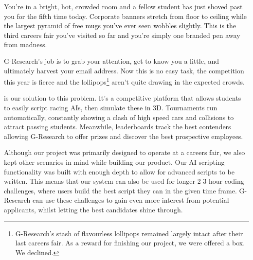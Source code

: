 You're in a bright, hot, crowded room and a fellow student has just shoved past you for the fifth time today. Corporate banners stretch from floor to ceiling while the largest pyramid of free mugs you've ever seen wobbles slightly. This is the third careers fair you've visited so far and you're simply one branded pen away from madness.

G-Research's job is to grab your attention, get to know you a little, and ultimately harvest your email address. Now this is no easy task, the competition this year is fierce and the lollipops\footnote{G-Research's stash of flavourless lollipops remained largely intact after their last careers fair. As a reward for finishing our project, we were offered a box. We declined.} aren't quite drawing in the expected crowds.

\project is our solution to this problem. It's a competitive platform that allows students to easily script racing AIs, then simulate these in 3D. Tournaments run automatically, constantly showing a clash of high speed cars and collisions to attract passing students. Meanwhile, leaderboards track the best contenders allowing G-Research to offer prizes and discover the best prospective employees. 

Although our project was primarily designed to operate at a careers fair, we also kept other scenarios in mind while building our product. Our AI scripting functionality was built with enough depth to allow for advanced scripts to be written. This means that our system can also be used for longer 2-3 hour coding challenges, where users build the best script they can in the given time frame. G-Research can use these challenges to gain even more interest from potential applicants, whilst letting the best candidates shine through.
